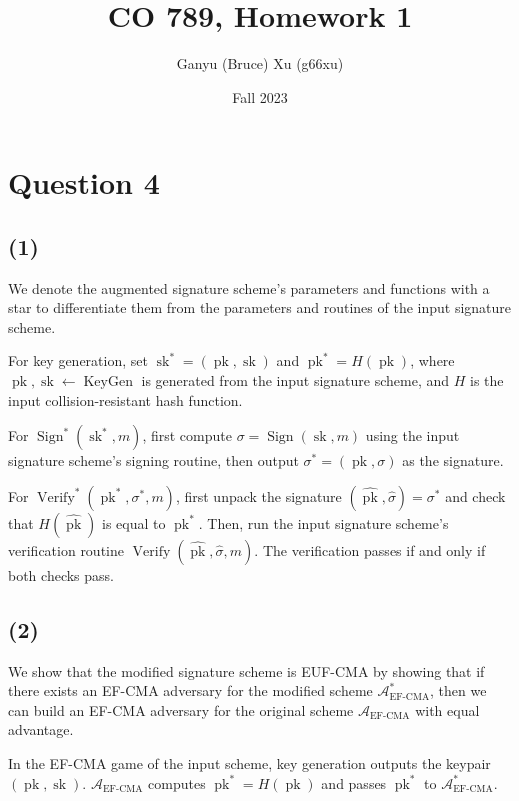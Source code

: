 \documentclass{article}
\title{CO 789, Homework 1}
\author{Ganyu (Bruce) Xu (g66xu)}
\date{Fall 2023}
\newcommand{\adv}{\mathcal{A}_\text{EF-CMA}}
\begin{document}

\section*{Question 4}
\subsection*{(1)}
We denote the augmented signature scheme's parameters and functions with a star to differentiate them from the parameters and routines of the input signature scheme.

For key generation, set $\operatorname{sk}^\ast = (\operatorname{pk}, \operatorname{sk})$ and $\operatorname{pk}^\ast = H(\operatorname{pk})$, where $\operatorname{pk}, \operatorname{sk} \leftarrow \operatorname{KeyGen}$ is generated from the input signature scheme, and $H$ is the input collision-resistant hash function.

For $\operatorname{Sign}^\ast(\operatorname{sk}^\ast, m)$, first compute $\sigma = \operatorname{Sign}(\operatorname{sk}, m)$ using the input signature scheme's signing routine, then output $\sigma^\ast = (\operatorname{pk}, \sigma)$ as the signature.

For $\operatorname{Verify}^\ast(\operatorname{pk}^\ast, \sigma^\ast, m)$, first unpack the signature $(\hat{\operatorname{pk}}, \hat{\sigma}) = \sigma^\ast$ and check that $H(\hat{\operatorname{pk}})$ is equal to $\operatorname{pk}^\ast$. Then, run the input signature scheme's verification routine $\operatorname{Verify}(\hat{\operatorname{pk}}, \hat{\sigma}, m)$. The verification passes if and only if both checks pass.

\subsection*{(2)}
We show that the modified signature scheme is EUF-CMA by showing that if there exists an EF-CMA adversary for the modified scheme $\adv^\ast$, then we can build an EF-CMA adversary for the original scheme $\adv$ with equal advantage.

In the EF-CMA game of the input scheme, key generation outputs the keypair $(\operatorname{pk}, \operatorname{sk})$. $\adv$ computes $\operatorname{pk}^\ast = H(\operatorname{pk})$ and passes $\operatorname{pk}^\ast$ to $\adv^\ast$.
\end{document}
